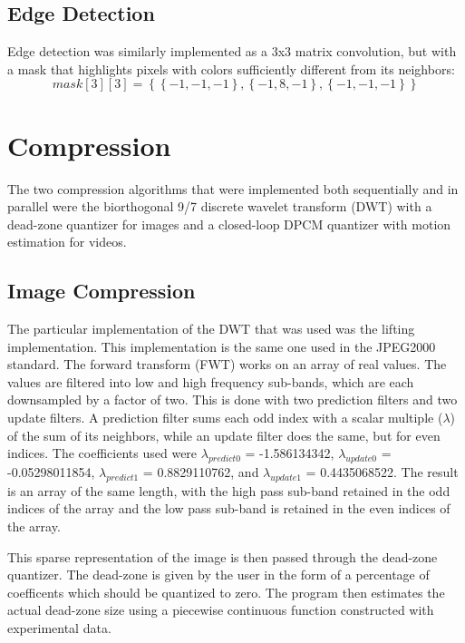 \documentclass[10pt,twocolumn,twoside]{IEEEtran}
\begin{document}
\subsection{Edge Detection}
Edge detection was similarly implemented as a 3x3 matrix convolution, but with a mask that highlights pixels with colors sufficiently different from its neighbors:
\begin{equation*}
mask[3][3] = \left\{ \left\{-1, -1, -1\right\}, \left\{-1, 8, -1\right\}, \left\{-1, -1, -1\right\} \right\}
\end{equation*}

\section{Compression}
The two compression algorithms that were implemented both sequentially and in parallel were the biorthogonal 9/7 discrete wavelet transform (DWT) with a dead-zone quantizer for images and a closed-loop DPCM quantizer with motion estimation for videos.

\subsection{Image Compression}

The particular implementation of the DWT that was used was the lifting implementation. This implementation is the same one used in the JPEG2000 standard. The forward transform (FWT) works on an array of real values. The values are filtered into low and high frequency sub-bands, which are each downsampled by a factor of two. This is done with two prediction filters and two update filters. A prediction filter sums each odd index with a scalar multiple ($\lambda$) of the sum of its neighbors, while an update filter does the same, but for even indices. The coefficients used were $\lambda_{predict0}$ = -1.586134342, $\lambda_{update0}$ = -0.05298011854, $\lambda_{predict1}$ = 0.8829110762, and $\lambda_{update1}$ = 0.4435068522. The result is an array of the same length, with the high pass sub-band retained in the odd indices of the array and the low pass sub-band is retained in the even indices of the array.

This sparse representation of the image is then passed through the dead-zone quantizer. The dead-zone is given by the user in the form of a percentage of coefficents which should be quantized to zero. The program then estimates the actual dead-zone size using a piecewise continuous function constructed with experimental data.
\end{document}
